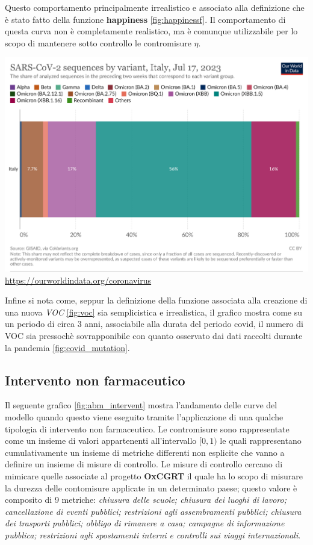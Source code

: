 Questo comportamento principalmente irrealistico e associato alla definizione che è stato fatto della 
funzione \textbf{happiness} \ref{fig:happinessf}. Il comportamento di questa curva non è completamente 
realistico, ma è comunque utilizzabile per lo scopo di mantenere sotto controllo le contromisure $\eta$.

\begin{minipage}{\linewidth}
	\centering
	\includegraphics[width=\textwidth]{img/coronavirus-data-explorer.png}
	\url{https://ourworldindata.org/coronavirus}
	\label{fig:covid_mutation}
\end{minipage}

Infine si nota come, seppur la definizione della funzione associata alla creazione di una
nuova \emph{VOC} \ref{fig:voc} sia semplicistica e irrealistica, il grafico mostra come 
su un periodo di circa 3 anni, associabile alla durata del periodo covid, 
il numero di VOC sia pressochè sovrapponibile con quanto osservato dai dati 
raccolti durante la pandemia \ref{fig:covid_mutation}. 
\newpage

\subsection{Intervento non farmaceutico}
Il seguente grafico \ref{fig:abm_intervent} mostra l'andamento delle curve del modello
quando questo viene eseguito tramite l'applicazione di una qualche tipologia di intervento non farmaceutico. 
Le contromisure sono rappresentate come un insieme di valori appartenenti all'intervallo $[0, 1)$ 
le quali rappresentano cumulativamente un insieme di metriche differenti non esplicite che vanno a definire 
un insieme di misure di controllo. Le misure di controllo cercano di mimicare quelle associate al progetto 
\textbf{OxCGRT} \cite{Hale2021} il quale ha lo scopo di misurare la durezza delle contomisure applicate in un determinato paese; 
questo valore è composito di 9 metriche: \emph{chiusura delle scuole; chiusura dei luoghi di lavoro; 
cancellazione di eventi pubblici; restrizioni agli assembramenti pubblici; 
chiusura dei trasporti pubblici; obbligo di rimanere a casa; campagne di informazione pubblica; 
restrizioni agli spostamenti interni e controlli sui viaggi internazionali}.

